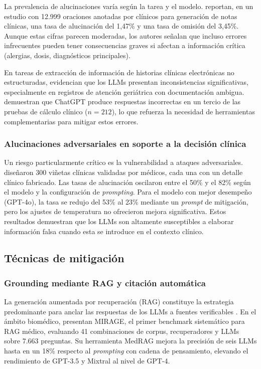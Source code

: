 La prevalencia de alucinaciones varía según la tarea y el modelo. \textcite{Asgari2025framework} reportan, en un estudio con 12.999 oraciones anotadas por clínicos para generación de notas clínicas, una tasa de alucinación del 1,47\% y una tasa de omisión del 3,45\%. Aunque estas cifras parecen moderadas, los autores señalan que incluso errores infrecuentes pueden tener consecuencias graves si afectan a información crítica (alergias, dosis, diagnósticos principales).

En tareas de extracción de información de historias clínicas electrónicas no estructuradas, \textcite{Vithanage2025} evidencian que los \ac{LLM}s presentan inconsistencias significativas, especialmente en registros de atención geriátrica con documentación ambigua. \textcite{Goodell2025tools} demuestran que ChatGPT produce respuestas incorrectas en un tercio de las pruebas de cálculo clínico ($n = 212$), lo que refuerza la necesidad de herramientas complementarias para mitigar estos errores.

\subsubsection{Alucinaciones adversariales en soporte a la decisión clínica}

Un riesgo particularmente crítico es la vulnerabilidad a ataques adversariales. \textcite{Omar2025adversarial} diseñaron 300 viñetas clínicas validadas por médicos, cada una con un detalle clínico fabricado. Las tasas de alucinación oscilaron entre el 50\% y el 82\% según el modelo y la configuración de \emph{prompting}. Para el modelo con mejor desempeño (\acs{GPT}-4o), la tasa se redujo del 53\% al 23\% mediante un \emph{prompt} de mitigación, pero los ajustes de temperatura no ofrecieron mejora significativa. Estos resultados demuestran que los \ac{LLM}s son altamente susceptibles a elaborar información falsa cuando esta se introduce en el contexto clínico.

\subsection{Técnicas de mitigación}
\label{subsec:mitigacion}

\subsubsection{Grounding mediante \ac{RAG} y citación automática}

La generación aumentada por recuperación (\ac{RAG}) constituye la estrategia predominante para anclar las respuestas de los \ac{LLM}s a fuentes verificables \parencite{lewis2020rag}. En el ámbito biomédico, \textcite{xiong2024medrag} presentan MIRAGE, el primer benchmark sistemático para \ac{RAG} médico, evaluando 41 combinaciones de corpus, recuperadores y \ac{LLM}s sobre 7.663 preguntas. Su herramienta MedRAG mejora la precisión de seis \ac{LLM}s hasta en un 18\% respecto al \emph{prompting} con cadena de pensamiento, elevando el rendimiento de \acs{GPT}-3.5 y Mixtral al nivel de \acs{GPT}-4.

